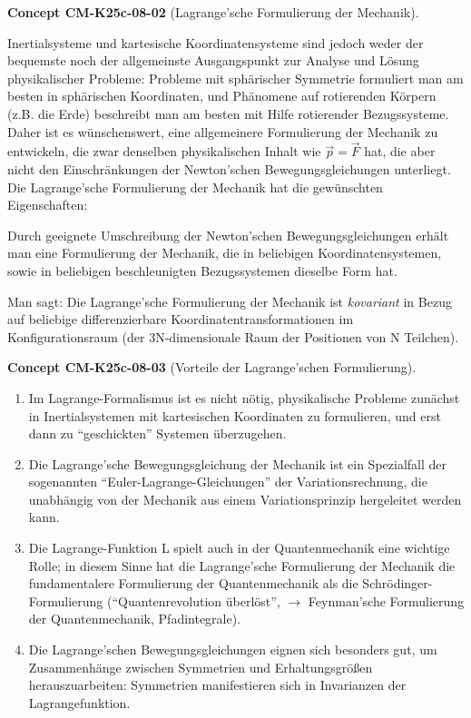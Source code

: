 \documentclass[10pt, letterpaper]{article}
\newcommand{\CustomHeading}[3]{%
  \par\medskip\noindent%
  \textbf{#1 #2} \textnormal{(#3)}.\enskip%
}
\newenvironment{CONC}[2]{\CustomHeading{Concept}{#1}{#2}}{}
\begin{document}
\begin{CONC}{CM-K25c-08-02}{Lagrange'sche Formulierung der Mechanik}
Inertialsysteme und kartesische Koordinatensysteme sind jedoch weder der bequemste noch der allgemeinste Ausgangspunkt zur Analyse und Lösung physikalischer Probleme: Probleme mit sphärischer Symmetrie formuliert man am besten in sphärischen Koordinaten, und Phänomene auf rotierenden Körpern (z.B. die Erde) beschreibt man am besten mit Hilfe rotierender Bezugssysteme. Daher ist es wünschenswert, eine allgemeinere Formulierung der Mechanik zu entwickeln, die zwar denselben physikalischen Inhalt wie $\vec{p}=\vec{F}$ hat, die aber nicht den Einschränkungen der Newton'schen Bewegungsgleichungen unterliegt. Die Lagrange'sche Formulierung der Mechanik hat die gewünschten Eigenschaften:

Durch geeignete Umschreibung der Newton'schen Bewegungsgleichungen erhält man eine Formulierung der Mechanik, die in beliebigen Koordinatensystemen, sowie in beliebigen beschleunigten Bezugssystemen dieselbe Form hat.

Man sagt: Die Lagrange'sche Formulierung der Mechanik ist \emph{kovariant} in Bezug auf beliebige differenzierbare Koordinatentransformationen im Konfigurationsraum (der 3N-dimensionale Raum der Positionen von N Teilchen).
\end{CONC}

\begin{CONC}{CM-K25c-08-03}{Vorteile der Lagrange'schen Formulierung}
\begin{enumerate}
\item Im Lagrange-Formalismus ist es nicht nötig, physikalische Probleme zunächst in Inertialsystemen mit kartesischen Koordinaten zu formulieren, und erst dann zu ``geschickten'' Systemen überzugehen.

\item Die Lagrange'sche Bewegungsgleichung der Mechanik ist ein Spezialfall der sogenannten ``Euler-Lagrange-Gleichungen'' der Variationsrechnung, die unabhängig von der Mechanik aus einem Variationsprinzip hergeleitet werden kann.

\item Die Lagrange-Funktion L spielt auch in der Quantenmechanik eine wichtige Rolle; in diesem Sinne hat die Lagrange'sche Formulierung der Mechanik die
fundamentalere Formulierung der Quantenmechanik als die Schrödinger-Formulierung (``Quantenrevolution überlöst'', $\to$ Feynman'sche Formulierung der Quantenmechanik, Pfadintegrale).

\item Die Lagrange'schen Bewegungsgleichungen eignen sich besonders gut, um Zusammenhänge zwischen Symmetrien und Erhaltungsgrößen herauszuarbeiten: Symmetrien manifestieren sich in Invarianzen der Lagrangefunktion.
\end{enumerate}
\end{CONC}
\end{document}
